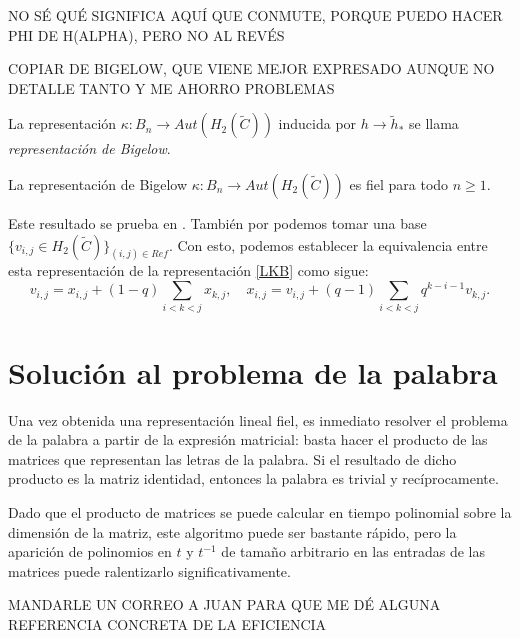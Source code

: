 \documentclass[TFG.tex]{subfiles}
\begin{document}
NO SÉ QUÉ SIGNIFICA AQUÍ QUE CONMUTE, PORQUE PUEDO HACER PHI DE H(ALPHA), PERO NO AL REVÉS

COPIAR DE BIGELOW, QUE VIENE MEJOR EXPRESADO AUNQUE NO DETALLE TANTO Y ME AHORRO PROBLEMAS

\begin{defi}
La representación $\kappa:B_n\to Aut(H_2(\tilde{C}))$ inducida por $h\to\tilde{h}_*$ se llama \emph{representación de Bigelow}.
\end{defi}

\begin{teorema}
La representación de Bigelow $\kappa:B_n\to Aut(H_2(\tilde{C}))$ es fiel para todo $n\geq 1$.
\end{teorema}

Este resultado se prueba en \cite{Bil}. También por \cite{Bil} podemos tomar una base $\{v_{i,j}\in H_2(\tilde{C})\}_{(i,j)\in Ref}$. Con esto, podemos establecer la equivalencia \cite{nundam} entre esta representación de la representación  \ref{LKB} como sigue:
\[
v_{i,j}=x_{i,j}+(1-q)\sum_{i<k<j}x_{k,j},\quad x_{i,j}=v_{i,j}+(q-1)\sum_{i<k<j}q^{k-i-1}v_{k,j}.
\]


\section{Solución al problema de la palabra}
Una vez obtenida una representación lineal fiel, es inmediato resolver el problema de la palabra a partir de la expresión matricial: basta hacer el producto de las matrices que representan las letras de la palabra. Si el resultado de dicho producto es la matriz identidad, entonces la palabra es trivial y recíprocamente.

Dado que el producto de matrices se puede calcular en tiempo polinomial sobre la dimensión de la matriz, este algoritmo puede ser bastante rápido, pero la aparición de polinomios en $t$ y $t^{-1}$ de tamaño arbitrario en las entradas de las matrices puede ralentizarlo significativamente.

MANDARLE UN CORREO A JUAN PARA QUE ME DÉ ALGUNA REFERENCIA CONCRETA DE LA EFICIENCIA
\end{document}
